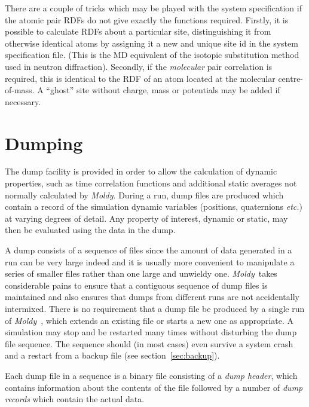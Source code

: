 \documentclass[a4paper,twoside]{report}
\newcommand{\moldy}{\emph{Moldy}}
\newcommand{\etc}{\emph{etc.}}
\begin{document}
There are a couple of tricks which may be played with the system
specification if the atomic pair RDFs do not give exactly the
functions required.  Firstly, it is possible to calculate RDFs about a
particular site, distinguishing it from otherwise identical atoms by
assigning it a new and unique site id in the system specification
file.  (This is the MD equivalent of the isotopic substitution method
used in neutron diffraction). Secondly, if the \emph{molecular} pair
correlation is required, this is identical to the RDF of an atom
located at the molecular centre-of-mass.  A ``ghost'' site without
charge, mass or potentials may be added if necessary.
\pagebreak[3]
\section{Dumping}%
\label{sec:dumping}
The dump facility is provided in order to allow the calculation of
dynamic properties, such as time correlation functions and additional
static averages not normally calculated by \moldy.  During a run, dump
files are produced which contain a record of the simulation dynamic
variables (positions, quaternions \etc) at varying degrees of
detail.  Any property of interest, dynamic or static, may then be
evaluated using the data in the dump.

A dump consists of a sequence of files since the amount of data
generated in a run can be very large indeed and it is usually more
convenient to manipulate a series of smaller files rather than one
large and unwieldy one. \moldy\  takes considerable pains to ensure that
a contiguous sequence of dump files is maintained and also ensures
that dumps from different runs are not accidentally intermixed.  There
is no requirement that a dump file be produced by a single run of
\moldy\ , which extends an existing file or starts a new one as appropriate.
A simulation may stop and be restarted many times without
disturbing the dump file sequence.  The  sequence
should (in most cases) even survive a system crash and a restart from
a backup file (see section~\ref{sec:backup}).

Each dump file in a sequence is a binary file consisting of a
\emph{dump header}, which contains information about the contents of
the file followed by a number of \emph{dump records} which contain the
actual data.
\end{document}
